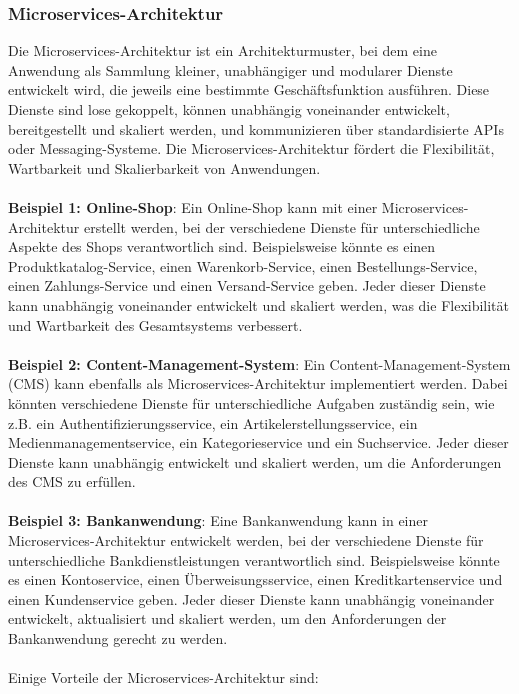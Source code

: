 \subsubsection{Microservices-Architektur}

Die Microservices-Architektur ist ein Architekturmuster, bei dem eine Anwendung als Sammlung kleiner, unabhängiger und modularer Dienste entwickelt wird, die jeweils eine bestimmte Geschäftsfunktion ausführen. Diese Dienste sind lose gekoppelt, können unabhängig voneinander entwickelt, bereitgestellt und skaliert werden, und kommunizieren über standardisierte APIs oder Messaging-Systeme. Die Microservices-Architektur fördert die Flexibilität, Wartbarkeit und Skalierbarkeit von Anwendungen.
\\\\
\textbf{Beispiel 1: Online-Shop}:
Ein Online-Shop kann mit einer Microservices-Architektur erstellt werden, bei der verschiedene Dienste für unterschiedliche Aspekte des Shops verantwortlich sind. Beispielsweise könnte es einen Produktkatalog-Service, einen Warenkorb-Service, einen Bestellungs-Service, einen Zahlungs-Service und einen Versand-Service geben. Jeder dieser Dienste kann unabhängig voneinander entwickelt und skaliert werden, was die Flexibilität und Wartbarkeit des Gesamtsystems verbessert.
\\\\
\textbf{Beispiel 2: Content-Management-System}:
Ein Content-Management-System (CMS) kann ebenfalls als Microservices-Architektur implementiert werden. Dabei könnten verschiedene Dienste für unterschiedliche Aufgaben zuständig sein, wie z.B. ein Authentifizierungsservice, ein Artikelerstellungsservice, ein Medienmanagementservice, ein Kategorieservice und ein Suchservice. Jeder dieser Dienste kann unabhängig entwickelt und skaliert werden, um die Anforderungen des CMS zu erfüllen.
\\\\
\textbf{Beispiel 3: Bankanwendung}:
Eine Bankanwendung kann in einer Microservices-Architektur entwickelt werden, bei der verschiedene Dienste für unterschiedliche Bankdienstleistungen verantwortlich sind. Beispielsweise könnte es einen Kontoservice, einen Überweisungsservice, einen Kreditkartenservice und einen Kundenservice geben. Jeder dieser Dienste kann unabhängig voneinander entwickelt, aktualisiert und skaliert werden, um den Anforderungen der Bankanwendung gerecht zu werden.
\\\\
Einige Vorteile der Microservices-Architektur sind:
